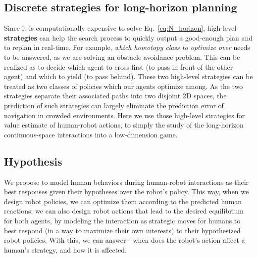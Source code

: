 \documentclass{article}
\begin{document}
\subsection{Discrete strategies for long-horizon planning}
Since it is computationally expensive to solve Eq.~\ref{eq:N_horizon}, high-level \textbf{strategies} can help the search process to quickly output a good-enough plan and to replan in real-time. For example, \textit{which homotopy class to optimize over} needs to be answered, as we are solving an obstacle avoidance problem. This can be realized as to decide which agent to cross first (to pass in front of the other agent) and which to yield (to pass behind). These two high-level strategies can be treated as two classes of policies which our agents optimize among. As the two strategies separate their associated paths into two disjoint 2D spaces, the prediction of such strategies can largely eliminate the prediction error of navigation in crowded environments. Here we use those high-level strategies for value estimate of human-robot actions, to simply the study of the long-horizon continuous-space interactions into a low-dimension game.

\subsection{Hypothesis}
We propose to model human behaviors during human-robot interactions as their best responses given their hypotheses over the robot's policy. This way, when we design robot policies, we can optimize them according to the predicted human reactions; we can also design robot actions that lead to the desired equilibrium for both agents, by modeling the interaction as strategic moves for humans to best respond (in a way to maximize their own interests) to their hypothesized robot policies. With this, we can answer - when does the robot's action affect a human's strategy, and how it is affected.




\end{document}

